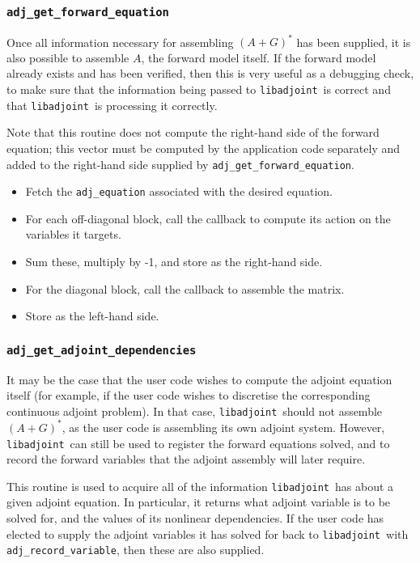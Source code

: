 \documentclass[10pt,authoryear]{elsarticle}
\newcommand{\libadjoint}[0]{{\texttt{libadjoint}}}
\begin{document}
\subsubsection{\texttt{{adj\_get\_forward\_equation}}}
Once all information necessary for assembling $(A+G)^{*}$ has been supplied, it is also possible to assemble
$A$, the forward model itself. If the forward model already exists and has been verified, then this is very useful
as a debugging check, to make sure that the information being passed to \libadjoint\ is correct and that \libadjoint\ 
is processing it correctly.

Note that this routine does not compute the right-hand side of the forward equation; this vector must be computed
by the application code separately and added to the right-hand side supplied by \texttt{adj\_get\_forward\_equation}.

\begin{itemize}
\item Fetch the \texttt{adj\_equation} associated with the desired equation.
\item For each off-diagonal block, call the callback to compute its action on the variables it targets.
\item Sum these, multiply by -1, and store as the right-hand side.
\item For the diagonal block, call the callback to assemble the matrix.
\item Store as the left-hand side.
\end{itemize}

\subsubsection{\texttt{adj\_get\_adjoint\_dependencies}}
It may be the case that the user code wishes to compute the adjoint equation itself
(for example, if the user code wishes to discretise the corresponding continuous adjoint problem).
In that case, \libadjoint\ should not assemble $(A+G)^*$, as the user code is assembling its own
adjoint system. However, \libadjoint\ can still be used to register the forward equations solved,
and to record the forward variables that the adjoint assembly will later require.

This routine is used to acquire all of the information \libadjoint\ has about a given
adjoint equation. In particular, it returns what adjoint variable is to be solved for,
and the values of its nonlinear dependencies. If the user code has elected to supply the adjoint
variables it has solved for back to \libadjoint\ with \texttt{adj\_record\_variable}, then these
are also supplied.
\end{document}
